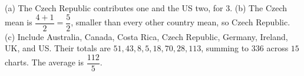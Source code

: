 (a) The Czech Republic contributes one and the US two, for $\boxed3$. (b) The Czech mean is $\dfrac{4+1}{2}=\dfrac{5}{2}$, smaller than every other country mean, so $\boxed{\text{Czech Republic}}$. (c) Include Australia, Canada, Costa Rica, Czech Republic, Germany, Ireland, UK, and US. Their totals are $51,43,8,5,18,70,28,113$, summing to $336$ across $15$ charts. The average is $\boxed{\dfrac{112}{5}}$.
